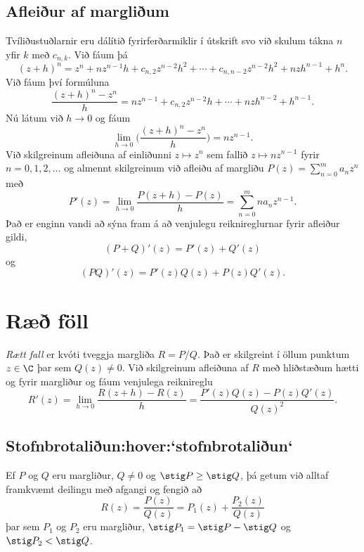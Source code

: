 \subsection*{Afleiður af margliðum}

Tvíliðustuðlarnir eru dálítið fyrirferðarmiklir í útskrift svo við
skulum tákna $n$ yfir $k$ með $c_{n,k}$.  Við fáum þá 
$$
(z+h)^n=z^n+nz^{n-1}h+c_{n,2}z^{n-2}h^2+\cdots+c_{n,n-2}z^{n-2}h^2+nzh^{n-1}+h^n.
$$
Við fáum því formúluna
$$
\dfrac{(z+h)^n-z^n}h=nz^{n-1}+c_{n,2}z^{n-2}h+\cdots+nzh^{n-2}+h^{n-1}.
$$
Nú látum við $h\to 0$ og fáum
$$\lim_{h\to 0}\bigg(
\dfrac{(z+h)^n-z^n}h\bigg)=nz^{n-1}.
$$
Við skilgreinum afleiðuna af einliðunni $z\mapsto z^n$ sem fallið
$z\mapsto nz^{n-1}$ fyrir $n=0,1,2,\dots$ og almennt skilgreinum við 
afleiðu af margliðu $P(z)=\sum_{n=0}^ma_nz^n$ með
$$
P'(z)=\lim_{h\to 0}\dfrac{P(z+h)-P(z)}h=\sum_{n=0}^mna_nz^{n-1}.
$$
Það er enginn vandi  að sýna fram á að venjulegu reiknireglurnar
 fyrir afleiður gildi,
$$
(P+Q)'(z)=P'(z)+Q'(z)
$$
og 
$$ 
(PQ)'(z)=P'(z)Q(z)+P(z)Q'(z).
$$

\section{Ræð föll}

{\it Rætt fall} er kvóti tveggja margliða $R=P/Q$. Það er
skilgreint í öllum punktum $z\in \C$  þar sem $Q(z)\neq 0$.
Við skilgreinum afleiðuna af $R$ með hliðstæðum hætti og fyrir
margliður og fáum venjulega reiknireglu
$$
R'(z)=\lim_{h\to
0}\dfrac{R(z+h)-R(z)}h=\dfrac{P'(z)Q(z)-P(z)Q'(z)}{Q(z)^2}.
$$


\subsection*{Stofnbrotaliðun:hover:`stofnbrotaliðun`}

\noindent
Ef $P$ og $Q$ eru margliður, $Q\neq 0$ og $\stig P\geq \stig Q$, 
þá getum við alltaf
framkvæmt deilingu með afgangi og fengið að
$$
R(z)=\dfrac {P(z)}{Q(z)}=P_1(z)+\dfrac {P_2(z)}{Q(z)}
$$ 
þar sem $P_1$ og $P_2$ eru margliður,  $\stig P_1=\stig P-\stig Q$ 
og $\stig P_2<\stig Q$.  


